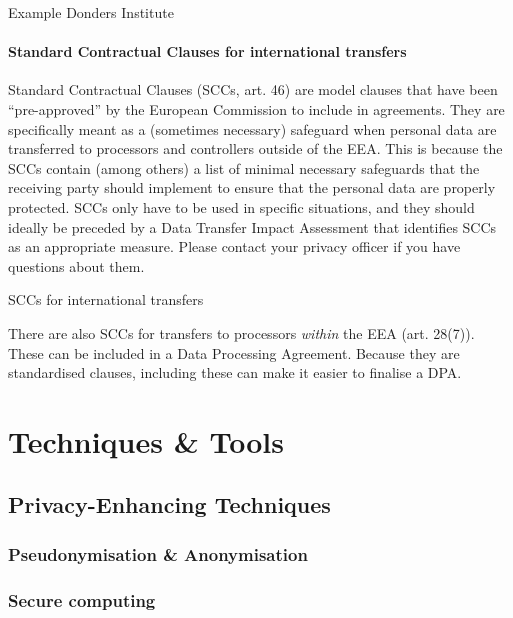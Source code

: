 \documentclass[
]{book}
\begin{document}
Example Donders Institute

\hypertarget{scc}{%
\subsection{Standard Contractual Clauses for international transfers}\label{scc}}

Standard Contractual Clauses (SCCs,
art. 46) are
model clauses that have been
``pre-approved'' by the European Commission
to include in agreements. They are specifically meant as a (sometimes necessary)
safeguard when personal data are transferred to processors and controllers
outside of the EEA. This is because the SCCs contain (among others) a list of
minimal necessary safeguards that the receiving party should implement to ensure
that the personal data are properly protected. SCCs only have to be used in
specific situations, and they should ideally be preceded by a
Data Transfer Impact Assessment that identifies SCCs as an
appropriate measure. Please contact your
privacy officer
if you have questions about them.

SCCs for international transfers

There are also SCCs for transfers to processors \emph{within} the EEA
(art. 28(7)).
These can be included in a
Data Processing Agreement. Because they
are standardised clauses, including these can make it easier to finalise a DPA.

\hypertarget{part-techniques-tools}{%
\part*{Techniques \& Tools}\label{part-techniques-tools}}

\hypertarget{privacy-enchancing-techniques}{%
\chapter{Privacy-Enhancing Techniques}\label{privacy-enchancing-techniques}}

\hypertarget{pseudonymisation-anonymisation}{%
\section{Pseudonymisation \& Anonymisation}\label{pseudonymisation-anonymisation}}

\hypertarget{secure-computing}{%
\section{Secure computing}\label{secure-computing}}
\end{document}

